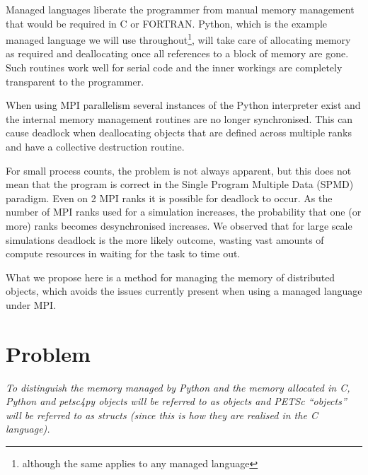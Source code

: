 \documentclass[10pt,journal,compsoc]{IEEEtran}
\begin{document}
Managed languages liberate the programmer from manual memory management that would be required in C or FORTRAN.
Python, which is the example managed language we will use throughout\footnote{although the same applies to any managed language}, will take care of allocating memory as required and deallocating once all references to a block of memory are gone.
Such routines work well for serial code and the inner workings are completely transparent to the programmer.

When using MPI parallelism several instances of the Python interpreter exist and the internal memory management routines are no longer synchronised.
This can cause deadlock when deallocating objects that are defined across multiple ranks and have a collective destruction routine.

For small process counts, the problem is not always apparent, but this does not mean that the program is correct in the Single Program Multiple Data (SPMD) paradigm.
Even on 2 MPI ranks it is possible for deadlock to occur.
As the number of MPI ranks used for a simulation increases, the probability that one (or more) ranks becomes desynchronised increases.
We observed that for large scale simulations deadlock is the more likely outcome, wasting vast amounts of compute resources in waiting for the task to time out.

What we propose here is a method for managing the memory of distributed objects, which avoids the issues currently present when using a managed language under MPI.



\section{Problem}
\label{sec:problem}


\emph{To distinguish the memory managed by Python and the memory allocated in C, Python and petsc4py objects will be referred to as objects and PETSc ``objects'' will be referred to as structs (since this is how they are realised in the C language).}
\end{document}
